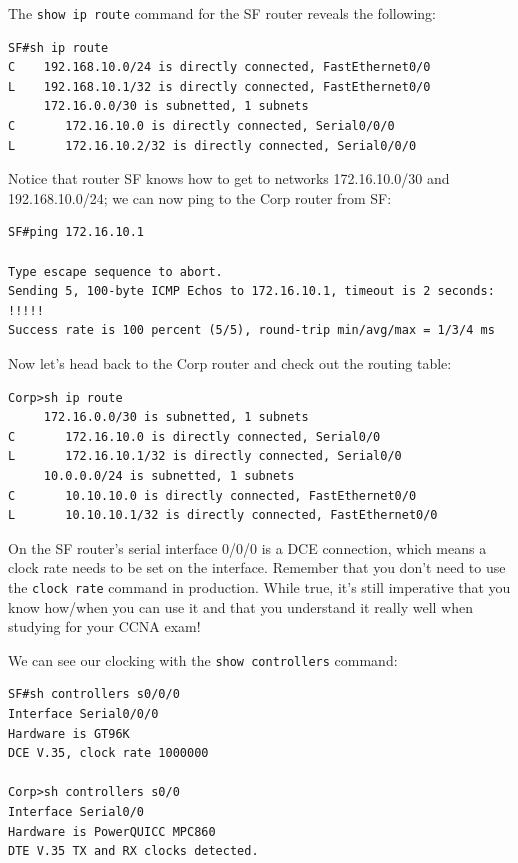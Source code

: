 The \texttt{show\ ip\ route} command for the SF router reveals the
following:

\begin{verbatim}
SF#sh ip route
C    192.168.10.0/24 is directly connected, FastEthernet0/0
L    192.168.10.1/32 is directly connected, FastEthernet0/0
     172.16.0.0/30 is subnetted, 1 subnets
C       172.16.10.0 is directly connected, Serial0/0/0
L       172.16.10.2/32 is directly connected, Serial0/0/0
\end{verbatim}

Notice that router SF knows how to get to networks 172.16.10.0/30 and
192.168.10.0/24; we can now ping to the Corp router from SF:

\begin{verbatim}
SF#ping 172.16.10.1
 
Type escape sequence to abort.
Sending 5, 100-byte ICMP Echos to 172.16.10.1, timeout is 2 seconds:
!!!!!
Success rate is 100 percent (5/5), round-trip min/avg/max = 1/3/4 ms
\end{verbatim}

Now let's head back to the Corp router and check out the routing table:

\begin{verbatim}
Corp>sh ip route
     172.16.0.0/30 is subnetted, 1 subnets
C       172.16.10.0 is directly connected, Serial0/0
L       172.16.10.1/32 is directly connected, Serial0/0
     10.0.0.0/24 is subnetted, 1 subnets
C       10.10.10.0 is directly connected, FastEthernet0/0
L       10.10.10.1/32 is directly connected, FastEthernet0/0
\end{verbatim}

On the SF router's serial interface 0/0/0 is a DCE connection, which
means a clock rate needs to be set on the interface. Remember that you
don't need to use the \texttt{clock\ rate} command in production. While
true, it's still imperative that you know how/when you can use it and
that you understand it really well when studying for your CCNA exam!

\protect\hypertarget{c09.xhtmlux5cux23Page_379}{}{}We can see our
clocking with the \texttt{show\ controllers} command:

\begin{verbatim}
SF#sh controllers s0/0/0
Interface Serial0/0/0
Hardware is GT96K
DCE V.35, clock rate 1000000

Corp>sh controllers s0/0
Interface Serial0/0
Hardware is PowerQUICC MPC860
DTE V.35 TX and RX clocks detected.
\end{verbatim}

